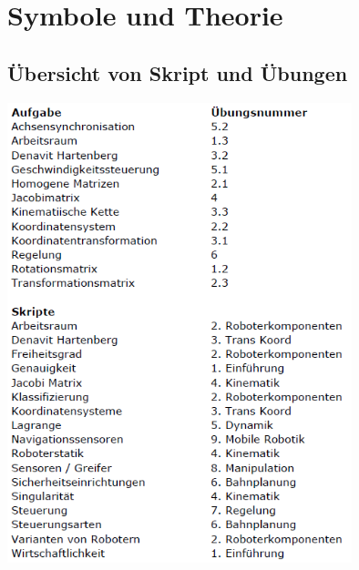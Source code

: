 \section{Symbole und Theorie}



	\subsection{Übersicht von Skript und Übungen}
	\includegraphics[width=10cm]{./bilder/uebersicht.png}